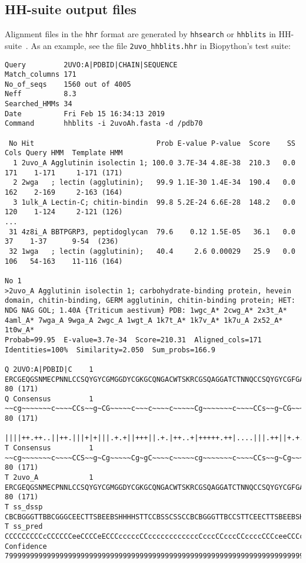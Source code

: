 \subsection{HH-suite output files}
\label{subsec:align_hhr}

Alignment files in the \verb|hhr| format are generated by \verb+hhsearch+ or \verb+hhblits+ in HH-suite~\cite{steinegger2019}.
As an example, see the file \verb+2uvo_hhblits.hhr+ in Biopython's test suite:

\begin{verbatim}
Query         2UVO:A|PDBID|CHAIN|SEQUENCE
Match_columns 171
No_of_seqs    1560 out of 4005
Neff          8.3
Searched_HMMs 34
Date          Fri Feb 15 16:34:13 2019
Command       hhblits -i 2uvoAh.fasta -d /pdb70

 No Hit                             Prob E-value P-value  Score    SS Cols Query HMM  Template HMM
  1 2uvo_A Agglutinin isolectin 1; 100.0 3.7E-34 4.8E-38  210.3   0.0  171    1-171     1-171 (171)
  2 2wga   ; lectin (agglutinin);   99.9 1.1E-30 1.4E-34  190.4   0.0  162    2-169     2-163 (164)
  3 1ulk_A Lectin-C; chitin-bindin  99.8 5.2E-24 6.6E-28  148.2   0.0  120    1-124     2-121 (126)
...
 31 4z8i_A BBTPGRP3, peptidoglycan  79.6    0.12 1.5E-05   36.1   0.0   37    1-37      9-54  (236)
 32 1wga   ; lectin (agglutinin);   40.4     2.6 0.00029   25.9   0.0  106   54-163    11-116 (164)

No 1
>2uvo_A Agglutinin isolectin 1; carbohydrate-binding protein, hevein domain, chitin-binding, GERM agglutinin, chitin-binding protein; HET: NDG NAG GOL; 1.40A {Triticum aestivum} PDB: 1wgc_A* 2cwg_A* 2x3t_A* 4aml_A* 7wga_A 9wga_A 2wgc_A 1wgt_A 1k7t_A* 1k7v_A* 1k7u_A 2x52_A* 1t0w_A*
Probab=99.95  E-value=3.7e-34  Score=210.31  Aligned_cols=171  Identities=100%  Similarity=2.050  Sum_probs=166.9

Q 2UVO:A|PDBID|C    1 ERCGEQGSNMECPNNLCCSQYGYCGMGGDYCGKGCQNGACWTSKRCGSQAGGATCTNNQCCSQYGYCGFGAEYCGAGCQG   80 (171)
Q Consensus         1 ~~cg~~~~~~~c~~~~CCs~~g~CG~~~~~c~~~c~~~~c~~~~~Cg~~~~~~~c~~~~CCs~~g~CG~~~~~c~~~c~~   80 (171)
                      ||||++.++..||++.|||+|+|||.+.+||+++||.+.|++..+|+++++.++|....|||.++||+.+.+||+.+||.
T Consensus         1 ~~cg~~~~~~~c~~~~CCS~~g~Cg~~~~~Cg~gC~~~~c~~~~~cg~~~~~~~c~~~~CCs~~g~Cg~~~~~c~~~c~~   80 (171)
T 2uvo_A            1 ERCGEQGSNMECPNNLCCSQYGYCGMGGDYCGKGCQNGACWTSKRCGSQAGGATCTNNQCCSQYGYCGFGAEYCGAGCQG   80 (171)
T ss_dssp             CBCBGGGTTBBCGGGCEECTTSBEEBSHHHHSTTCCBSSCSSCCBCBGGGTTBCCSTTCEECTTSBEEBSHHHHSTTCCB
T ss_pred             CCCCCCCCCcCCCCCCeeCCCCeECCCcccccCCccccccccccccCcccCCcccCCccccCCCceeCCCccccCCCccc
Confidence            79999999999999999999999999999999999999999999999999999999999999999999999999999999



\end{verbatim}
